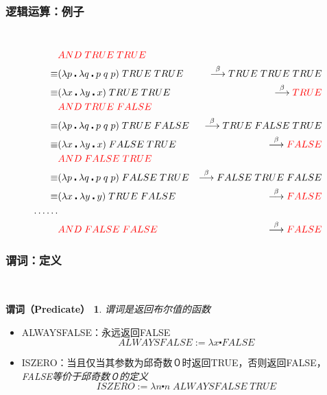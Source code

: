 \documentclass[CJKutf8,compress,hyperref]{beamer}
\begin{document}
\begin{CJK}{UTF8}{song}
\begin{frame}
  \frametitle{逻辑运算：例子}　
  \begin{eqnarray*}
    & {\color{red}AND \; TRUE \; TRUE} & \\ 
    \equiv & (\lambda p \centerdot \lambda q \centerdot p \; q \; p) \; TRUE \; TRUE & \stackrel{\beta}{\longrightarrow} TRUE \; TRUE \; TRUE \\ 
    \equiv & (\lambda x \centerdot \lambda y \centerdot x) \; TRUE \; TRUE & \stackrel{\beta}{\longrightarrow} {\color{red}TRUE} \\ 
    & {\color{red}AND \; TRUE \; FALSE} & \\ 
    \equiv & (\lambda p \centerdot \lambda q \centerdot p \; q \; p) \; TRUE \; FALSE & \stackrel{\beta}{\longrightarrow} TRUE \; FALSE \; TRUE \\ 
    \equiv & (\lambda x \centerdot \lambda y \centerdot x) \; FALSE \; TRUE & \stackrel{\beta}{\longrightarrow} {\color{red}FALSE} \\ 
    & {\color{red}AND \; FALSE \; TRUE} & \\ 
    \equiv & (\lambda p \centerdot \lambda q \centerdot p \; q \; p) \; FALSE \; TRUE & \stackrel{\beta}{\longrightarrow} FALSE \; TRUE \; FALSE \\ 
    \equiv & (\lambda x \centerdot \lambda y \centerdot y) \; TRUE \; FALSE & \stackrel{\beta}{\longrightarrow} {\color{red}FALSE} \\ 
    \dots \dots  \\ 
    & {\color{red}AND \; FALSE \; FALSE} & \stackrel{\beta}{\longrightarrow} {\color{red}FALSE} \\ 
  \end{eqnarray*}
\end{frame}

\begin{frame}
  \frametitle{谓词：定义}　
  \newtheorem{predF}{谓词（Predicate）} 
  \begin{predF}
    谓词是返回布尔值的函数 
  \end{predF}
  \begin{itemize}
  \item ALWAYSFALSE：永远返回FALSE 
    \begin{displaymath}
      ALWAYSFALSE := \lambda x \centerdot FALSE 
    \end{displaymath}
  \item ISZERO：当且仅当其参数为邱奇数０时返回TRUE，否则返回FALSE，\emph{\color{red}FALSE等价于邱奇数０的定义}
    \begin{displaymath}
      ISZERO := \lambda n \centerdot n \; ALWAYSFALSE \; TRUE
    \end{displaymath}
  \end{itemize}
\end{frame}


\end{CJK}
\end{document}
